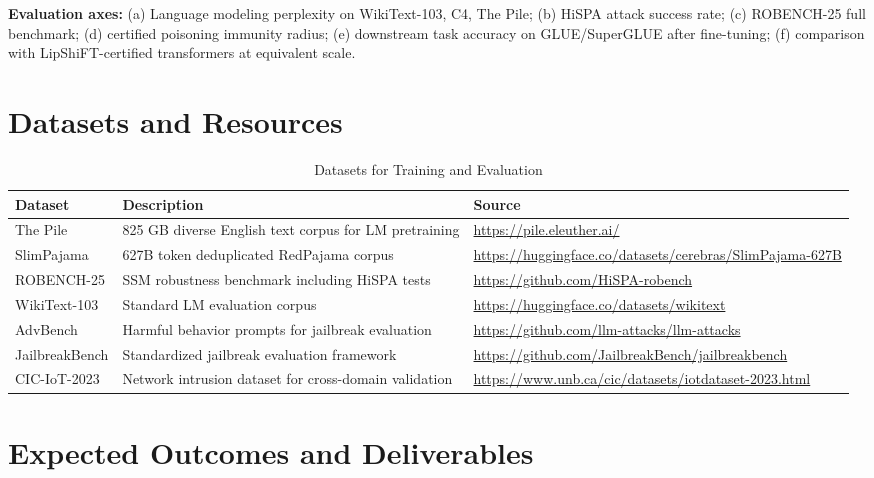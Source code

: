 \documentclass[12pt,a4paper]{article}
\begin{document}
\textbf{Evaluation axes:} (a) Language modeling perplexity on WikiText-103, C4, The Pile; (b) HiSPA attack success rate; (c) ROBENCH-25 full benchmark; (d) certified poisoning immunity radius; (e) downstream task accuracy on GLUE/SuperGLUE after fine-tuning; (f) comparison with LipShiFT-certified transformers at equivalent scale.

\section{Datasets and Resources}

\begin{table}[H]
\centering
\caption{Datasets for Training and Evaluation}
\begin{tabularx}{\textwidth}{@{}lXl@{}}
\toprule
\textbf{Dataset} & \textbf{Description} & \textbf{Source} \\
\midrule
The Pile & 825 GB diverse English text corpus for LM pretraining & \url{https://pile.eleuther.ai/} \\
\addlinespace
SlimPajama & 627B token deduplicated RedPajama corpus & \url{https://huggingface.co/datasets/cerebras/SlimPajama-627B} \\
\addlinespace
ROBENCH-25 & SSM robustness benchmark including HiSPA tests & \url{https://github.com/HiSPA-robench} \\
\addlinespace
WikiText-103 & Standard LM evaluation corpus & \url{https://huggingface.co/datasets/wikitext} \\
\addlinespace
AdvBench & Harmful behavior prompts for jailbreak evaluation & \url{https://github.com/llm-attacks/llm-attacks} \\
\addlinespace
JailbreakBench & Standardized jailbreak evaluation framework & \url{https://github.com/JailbreakBench/jailbreakbench} \\
\addlinespace
CIC-IoT-2023 & Network intrusion dataset for cross-domain validation & \url{https://www.unb.ca/cic/datasets/iotdataset-2023.html} \\
\bottomrule
\end{tabularx}
\end{table}

\section{Expected Outcomes and Deliverables}
\end{document}

